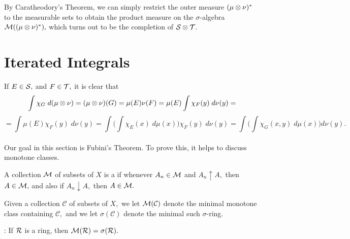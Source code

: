 \noindent By Caratheodory's Theorem, we can simply restrict the outer measure $(\mu\otimes\nu)^*$ to the measurable sets to obtain the product measure on the $\sigma$-algebra $\mathcal{M}((\mu\otimes\nu)^*),$ which turns out to be the completion of $\mathcal{S}\otimes\mathcal{T}.$

\section{Iterated Integrals}
\noindent If $E\in\mathcal{S},$ and $F\in\mathcal{T},$ it is clear that
$$\int\chi_G\;d(\mu\otimes\nu)=(\mu\otimes\nu)(G)=\mu(E)\nu(F)=\mu(E)\int\chi_F(y)\;d\nu(y)=$$
$$=\int\mu(E)\chi_F(y)\;d\nu(y)=\int\Big(\int\chi_E(x)\;d\mu(x)\Big)\chi_F(y)\;d\nu(y)=\int\Big(\int\chi_G(x,y)\;d\mu(x)\Big)d\nu(y).$$ \\

\noindent Our goal in this section is Fubini's Theorem. To prove this, it helps to discuss monotone classes.

\begin{defn}
A collection $\mathcal{M}$ of subsets of $X$ is a  if whenever $A_n\in\mathcal{M}$ and $A_n\uparrow A,$ then $A\in\mathcal{M},$ and also if $A_n\downarrow A,$ then $A\in\mathcal{M}.$
\end{defn}

\noindent Given a collection $\mathcal{C}$ of subsets of $X,$ we let $\mathcal{M}(\mathcal{C})$ denote the minimal monotone class containing $\mathcal{C},$ and we let $\sigma(\mathcal{C})$ denote the minimal such $\sigma$-ring.

\begin{frame*}
\noindent{}: If $\mathcal{R}$ is a ring, then $\mathcal{M}(\mathcal{R})=\sigma(\mathcal{R}).$ \\
\end{frame*}

